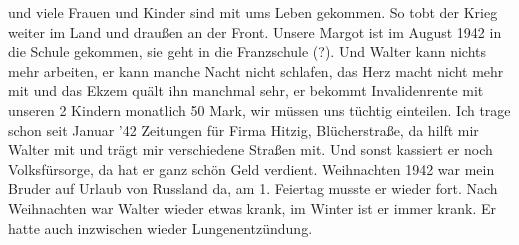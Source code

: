 \documentclass[a5paper,11pt,openany]{book}
\newcommand{\seite}[1]{\leavevmode\marginpar{\footnotesize\itshape\raggedright #1}\ignorespaces}
\begin{document}
  und viele Frauen und Kinder sind mit ums Leben gekommen.
So tobt der Krieg weiter im Land und draußen an der Front.
Unsere Margot ist im August 1942 in die Schule gekommen, sie geht in die Franzschule (?).
Und Walter kann nichts mehr arbeiten, er kann manche Nacht nicht schlafen,
  das Herz macht nicht mehr mit und das Ekzem quält ihn manchmal sehr, er bekommt
\seite{57}
Invalidenrente mit unseren 2 Kindern monatlich 50 Mark, wir müssen uns tüchtig einteilen.
Ich trage schon seit Januar '42 Zeitungen für Firma Hitzig,
  Blücherstraße, da hilft mir Walter mit und trägt mir verschiedene Straßen mit.
Und sonst kassiert er noch Volksfürsorge, da hat er ganz schön Geld verdient.
Weihnachten 1942 war mein Bruder auf Urlaub von Russland da, am 1. Feiertag musste er wieder fort.
Nach Weihnachten war Walter wieder etwas krank, im Winter ist er immer krank.
Er hatte auch inzwischen wieder
\seite{58}
Lungenentzündung.
\end{document}
